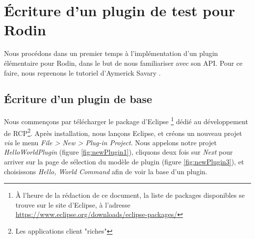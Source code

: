 \section{Écriture d'un plugin de test pour Rodin}

Nous procédons dans un premier temps à l'implémentation d'un plugin élémentaire pour Rodin, dans le but de nous familiariser avec son API.
Pour ce faire, nous reprenons le tutoriel d'Aymerick Savary \cite{asavary}.

\subsection{Écriture d'un plugin de base}

Nous commençons par télécharger le package d'Eclipse
\footnote{À l'heure de la rédaction de ce document, la liste de packages disponibles se trouve sur le site d'Eclipse, %
à l'adresse \href{https://www.eclipse.org/downloads/eclipse-packages/}{https://www.eclipse.org/downloads/eclipse-packages/}
} dédié au développement de RCP\footnote{Les applications client "riches"}.
Après installation, nous lançons Eclipse, et créons un nouveau projet \textit{via} le menu \textit{File > New > Plug-in Project}.
Nous appelons notre projet \textit{HelloWorldPlugin} (figure \ref{fig:newPlugin1}), cliquons deux fois sur \textit{Next} pour arriver %
sur la page de sélection du modèle de plugin (figure \ref{fig:newPlugin3}), et choisissons \textit{Hello, World Command} afin de voir la base d'un plugin.


